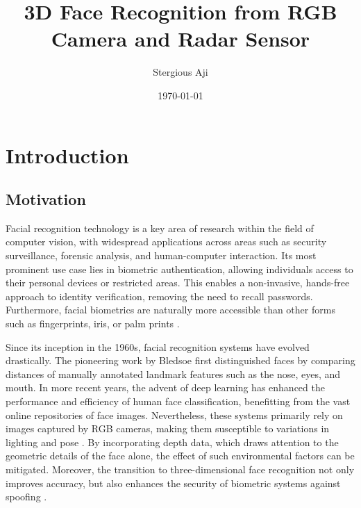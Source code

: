 \documentclass{interim}
\begin{document}
\title{3D Face Recognition from RGB Camera and Radar Sensor}
\author{Stergious Aji}
\date{\today}
\maketitle

{\hypersetup{hidelinks}\tableofcontents}
\newpage

\section{Introduction}\label{intro}

\subsection{Motivation}
Facial recognition technology is a key area of research within the field of computer vision, with widespread applications across areas such as security surveillance, forensic analysis, and human-computer interaction. Its most prominent use case lies in biometric authentication, allowing individuals access to their personal devices or restricted areas. This enables a non-invasive, hands-free approach to identity verification, removing the need to recall passwords. Furthermore, facial biometrics are naturally more accessible than other forms such as fingerprints, iris, or palm prints \cite{zhou20183d}.

Since its inception in the 1960s, facial recognition systems have evolved drastically. The pioneering work by Bledsoe \cite{bledsoe1966model} first distinguished faces by comparing distances of manually annotated landmark features such as the nose, eyes, and mouth. In more recent years, the advent of deep learning has enhanced the performance and efficiency of human face classification, benefitting from the vast online repositories of face images.  Nevertheless, these systems primarily rely on images captured by RGB cameras, making them susceptible to variations in lighting and pose \cite{xu2004depth}. By incorporating depth data, which draws attention to the geometric details of the face alone, the effect of such environmental factors can be mitigated. Moreover, the transition to three-dimensional face recognition not only improves accuracy, but also enhances the security of biometric systems against spoofing \cite{wen2015face}.
\end{document}
